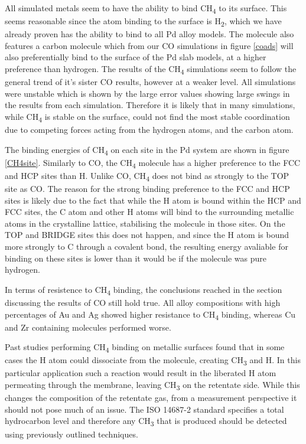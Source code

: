 All simulated metals seem to have the ability to bind CH\textsubscript{4} to its surface. This seems reasonable since the atom binding to the surface is H\textsubscript{2}, which we have already proven has the ability to bind to all Pd alloy models. The molecule also features a carbon molecule which from our CO simulations in figure \ref{coads} will also preferentially bind to the surface of the Pd slab models, at a higher preference than hydrogen. The results of the CH\textsubscript{4} simulations seem to follow the general trend of it's sister CO results, however at a weaker level.  All simulations were unstable which is shown by the large error values showing large swings in the results from each simulation. Therefore it is likely that in many simulations, while CH\textsubscript{4} is stable on the surface, could not find the most stable coordination due to competing forces acting from the hydrogen atoms, and the carbon atom. 

The binding energies of CH\textsubscript{4} on each site in the Pd system are shown in figure \ref{CH4site}. Similarly to CO, the CH\textsubscript{4} molecule has a higher preference to the FCC and HCP sites than H. Unlike CO, CH\textsubscript{4} does not bind as strongly to the TOP site as CO. The reason for the strong binding preference to the FCC and HCP sites is likely due to the fact that while the H atom is bound within the HCP and FCC sites, the C atom and other H atoms will bind to the surrounding metallic atoms in the crystalline lattice, stabilising the molecule in those sites. On the TOP and BRIDGE sites this does not happen, and since the H atom is bound more strongly to C through a covalent bond, the resulting energy avaliable for binding on these sites is lower than it would be if the molecule was pure hydrogen. 

In terms of resistence to CH\textsubscript{4} binding, the conclusions reached in the section discussing the results of CO still hold true. All alloy compositions with high percentages of Au and Ag showed higher resistance to CH\textsubscript{4} binding, whereas Cu and Zr containing molecules performed worse. 

Past studies performing CH\textsubscript{4} binding on metallic surfaces found that in some cases the H atom could dissociate from the molecule, creating CH\textsubscript{3} and H. \cite{doi:10.1021/acs.jpcc.8b03184} In this particular application such a reaction would result in the liberated H atom permeating through the membrane, leaving CH\textsubscript{3} on the retentate side. While this changes the composition of the retentate gas, from a measurement perspective it should not pose much of an issue. The ISO 14687-2\cite{InternationalStandardISO14687-2:20122012} standard specifies a total hydrocarbon level and therefore any CH\textsubscript{3} that is produced should be detected using previously outlined techniques. \cite{Murugan2015}

